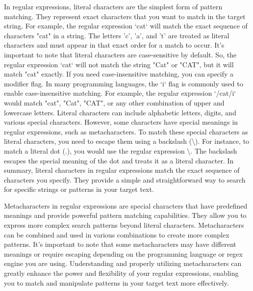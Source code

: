 \documentclass{report}
\begin{document}
    \pagebreak \bigbreak \noindent
    In regular expressions, literal characters are the simplest form of pattern matching. They represent exact characters that you want to match in the target string.
    \bigbreak \noindent 
    For example, the regular expression `cat` will match the exact sequence of characters "cat" in a string. The letters 'c', 'a', and 't' are treated as literal characters and must appear in that exact order for a match to occur.
    \bigbreak \noindent 
    It's important to note that literal characters are case-sensitive by default. So, the regular expression `cat` will not match the string "Cat" or "CAT", but it will match "cat" exactly.
    \bigbreak \noindent 
    If you need case-insensitive matching, you can specify a modifier flag. In many programming languages, the `i` flag is commonly used to enable case-insensitive matching. For example, the regular expression `/cat/i` would match "cat", "Cat", "CAT", or any other combination of upper and lowercase letters.
    \bigbreak \noindent 
    Literal characters can include alphabetic letters, digits, and various special characters. However, some characters have special meanings in regular expressions, such as metacharacters. To match these special characters as literal characters, you need to escape them using a backslash (\textbackslash).
    \bigbreak \noindent 
    For instance, to match a literal dot (.), you would use the regular expression \textbackslash. The backslash escapes the special meaning of the dot and treats it as a literal character.
    \bigbreak \noindent 
    In summary, literal characters in regular expressions match the exact sequence of characters you specify. They provide a simple and straightforward way to search for specific strings or patterns in your target text.

    \pagebreak
    \bigbreak
    \noindent

    Metacharacters in regular expressions are special characters that have predefined meanings and provide powerful pattern matching capabilities. They allow you to express more complex search patterns beyond literal characters.
    \bigbreak \noindent 
    Metacharacters can be combined and used in various combinations to create more complex patterns. It's important to note that some metacharacters may have different meanings or require escaping depending on the programming language or regex engine you are using.
    \bigbreak \noindent 
    Understanding and properly utilizing metacharacters can greatly enhance the power and flexibility of your regular expressions, enabling you to match and manipulate patterns in your target text more effectively.
    \bigbreak \noindent 
\end{document}
